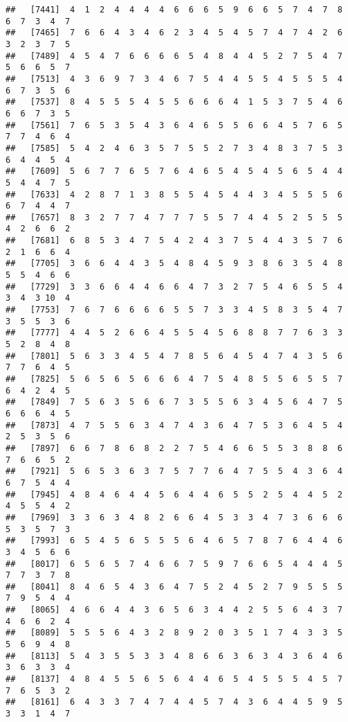 \documentclass[
]{book}
\begin{document}
\begin{verbatim}
##   [7441]  4  1  2  4  4  4  4  6  6  6  5  9  6  6  5  7  4  7  8  6  7  3  4  7
##   [7465]  7  6  6  4  3  4  6  2  3  4  5  4  5  7  4  7  4  2  6  3  2  3  7  5
##   [7489]  4  5  4  7  6  6  6  6  5  4  8  4  4  5  2  7  5  4  7  5  6  6  5  7
##   [7513]  4  3  6  9  7  3  4  6  7  5  4  4  5  5  4  5  5  5  4  6  7  3  5  6
##   [7537]  8  4  5  5  5  4  5  5  6  6  6  4  1  5  3  7  5  4  6  6  6  7  3  5
##   [7561]  7  6  5  3  5  4  3  6  4  6  5  5  6  6  4  5  7  6  5  7  7  4  6  4
##   [7585]  5  4  2  4  6  3  5  7  5  5  2  7  3  4  8  3  7  5  3  6  4  4  5  4
##   [7609]  5  6  7  7  6  5  7  6  4  6  5  4  5  4  5  6  5  4  4  5  4  4  7  5
##   [7633]  4  2  8  7  1  3  8  5  5  4  5  4  4  3  4  5  5  5  6  6  7  4  4  7
##   [7657]  8  3  2  7  7  4  7  7  7  5  5  7  4  4  5  2  5  5  5  4  2  6  6  2
##   [7681]  6  8  5  3  4  7  5  4  2  4  3  7  5  4  4  3  5  7  6  2  1  6  6  4
##   [7705]  3  6  6  4  4  3  5  4  8  4  5  9  3  8  6  3  5  4  8  5  5  4  6  6
##   [7729]  3  3  6  6  4  4  6  6  4  7  3  2  7  5  4  6  5  5  4  3  4  3 10  4
##   [7753]  7  6  7  6  6  6  6  5  5  7  3  3  4  5  8  3  5  4  7  3  5  5  3  6
##   [7777]  4  4  5  2  6  6  4  5  5  4  5  6  8  8  7  7  6  3  3  5  2  8  4  8
##   [7801]  5  6  3  3  4  5  4  7  8  5  6  4  5  4  7  4  3  5  6  7  7  6  4  5
##   [7825]  5  6  5  6  5  6  6  6  4  7  5  4  8  5  5  6  5  5  7  6  4  2  4  5
##   [7849]  7  5  6  3  5  6  6  7  3  5  5  6  3  4  5  6  4  7  5  6  6  6  4  5
##   [7873]  4  7  5  5  6  3  4  7  4  3  6  4  7  5  3  6  4  5  4  2  5  3  5  6
##   [7897]  6  6  7  8  6  8  2  2  7  5  4  6  6  5  5  3  8  8  6  7  6  6  5  2
##   [7921]  5  6  5  3  6  3  7  5  7  7  6  4  7  5  5  4  3  6  4  6  7  5  4  4
##   [7945]  4  8  4  6  4  4  5  6  4  4  6  5  5  2  5  4  4  5  2  4  5  5  4  2
##   [7969]  3  3  6  3  4  8  2  6  6  4  5  3  3  4  7  3  6  6  6  5  3  5  7  3
##   [7993]  6  5  4  5  6  5  5  5  6  4  6  5  7  8  7  6  4  4  6  3  4  5  6  6
##   [8017]  6  5  6  5  7  4  6  6  7  5  9  7  6  6  5  4  4  4  5  7  7  3  7  8
##   [8041]  8  4  6  5  4  3  6  4  7  5  2  4  5  2  7  9  5  5  5  7  9  5  4  4
##   [8065]  4  6  6  4  4  3  6  5  6  3  4  4  2  5  5  6  4  3  7  4  6  6  2  4
##   [8089]  5  5  5  6  4  3  2  8  9  2  0  3  5  1  7  4  3  3  5  5  6  9  4  8
##   [8113]  5  4  3  5  5  3  3  4  8  6  6  3  6  3  4  3  6  4  6  3  6  3  3  4
##   [8137]  4  8  4  5  5  6  5  6  4  4  6  5  4  5  5  5  4  5  7  7  6  5  3  2
##   [8161]  6  4  3  3  7  4  7  4  4  5  7  4  3  6  4  4  5  9  5  3  3  1  4  7

\end{verbatim}
\end{document}
